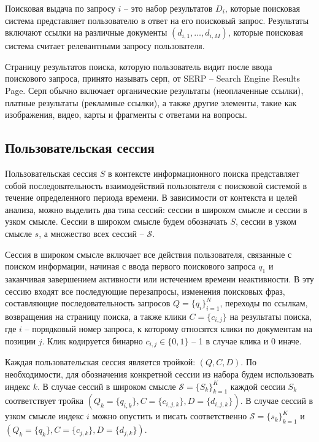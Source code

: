 \documentclass[diploma]{nanolab2015}
\begin{document}
Поисковая выдача по запросу $i$ -- это набор результатов $D_i$, которые поисковая система представляет пользователю в ответ на его поисковый запрос. Результаты включают ссылки на различные документы $(d_{i,1}, \dots, d_{i, M})$, которые поисковая система считает релевантными запросу пользователя.

Страницу результатов поиска, которую пользователь видит после ввода поискового запроса, принято называть серп, от SERP -- Search Engine Results Page. Серп обычно включает органические результаты (неоплаченные ссылки), платные результаты (рекламные ссылки), а также другие элементы, такие как изображения, видео, карты и фрагменты с ответами на вопросы.

\subsection{Пользовательская сессия}

Пользовательская сессия $S$ в контексте информационного поиска представляет собой последовательность взаимодействий пользователя с поисковой системой в течение определенного периода времени. В зависимости от контекста и целей анализа, можно выделить два типа сессий: сессии в широком смысле и сессии в узком смысле. Сессии в широком смысле будем обозначать $S$, сессии в узком смысле $s$, а множество всех сессий -- $\mathcal{S}$.

Сессия в широком смысле включает все действия пользователя, связанные с поиском информации, начиная с ввода первого поискового запроса $q_1$ и заканчивая завершением активности или истечением времени неактивности. В эту сессию входят все последующие перезапросы, изменения поисковых фраз, составляющие последовательность запросов $Q = \{q_i\}_{i=1}^N$, переходы по ссылкам, возвращения на страницу поиска, а также клики $C = \{c_{i,j}\}$ на результаты поиска, где $i$ -- порядковый номер запроса, к которому относятся клики по документам на позиции $j$. Клик кодируется бинарно $c_{i,j} \in \{0, 1\}$ -- 1 в случае клика и 0 иначе.

Каждая пользовательская сессия является тройкой: $(Q, C, D)$. По необходимости, для обозначения конкретной сессии из набора будем использовать индекс $k$. В случае сессий в широком смысле $\mathcal{S} = \{S_k\}_{k=1}^K$ каждой сессии $S_k$ соответствует тройка $(Q_{k} = \{q_{i,k}\}, C = \{c_{i,j,k}\}, D = \{d_{i,j,k}\})$. В случае сессий в узком смысле индекс $i$ можно опустить и писать соответственно $\mathcal{S} = \{s_k\}_{k=1}^K$ и $(Q_{k} = \{q_{k}\}, C = \{c_{j,k}\}, D = \{d_{j,k}\})$.
\end{document}
